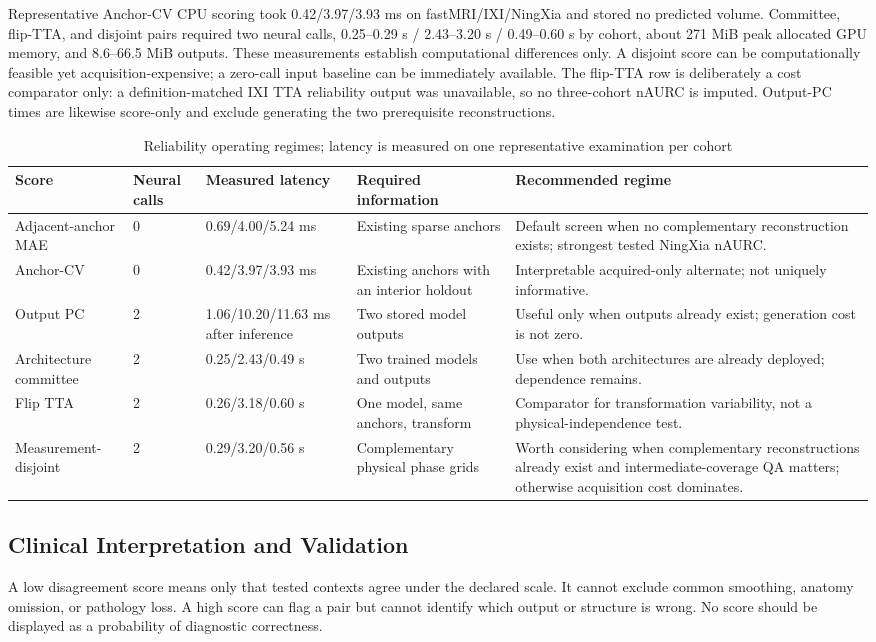 \documentclass[journal,10pt]{IEEEtran}
\begin{document}
Representative Anchor-CV CPU scoring took 0.42/3.97/3.93 ms on fastMRI/IXI/NingXia and stored no predicted volume. Committee, flip-TTA, and disjoint pairs required two neural calls, 0.25--0.29 s / 2.43--3.20 s / 0.49--0.60 s by cohort, about 271 MiB peak allocated GPU memory, and 8.6--66.5 MiB outputs. These measurements establish computational differences only. A disjoint score can be computationally feasible yet acquisition-expensive; a zero-call input baseline can be immediately available.
The flip-TTA row is deliberately a cost comparator only: a definition-matched IXI TTA reliability output was unavailable, so no three-cohort nAURC is imputed. Output-PC times are likewise score-only and exclude generating the two prerequisite reconstructions.

\begin{table}[t]
\caption{Reliability operating regimes; latency is measured on one representative examination per cohort}
\label{tab:operating-regime}\centering
\begin{tabular}{p{3.0cm}p{2.1cm}p{2.5cm}p{3.2cm}p{4.6cm}}
\toprule
Score&Neural calls&Measured latency&Required information&Recommended regime\\
\midrule
Adjacent-anchor MAE&0&0.69/4.00/5.24 ms&Existing sparse anchors&Default screen when no complementary reconstruction exists; strongest tested NingXia nAURC.\\
Anchor-CV&0&0.42/3.97/3.93 ms&Existing anchors with an interior holdout&Interpretable acquired-only alternate; not uniquely informative.\\
Output PC&2&1.06/10.20/11.63 ms after inference&Two stored model outputs&Useful only when outputs already exist; generation cost is not zero.\\
Architecture committee&2&0.25/2.43/0.49 s&Two trained models and outputs&Use when both architectures are already deployed; dependence remains.\\
Flip TTA&2&0.26/3.18/0.60 s&One model, same anchors, transform&Comparator for transformation variability, not a physical-independence test.\\
Measurement-disjoint&2&0.29/3.20/0.56 s&Complementary physical phase grids&Worth considering when complementary reconstructions already exist and intermediate-coverage QA matters; otherwise acquisition cost dominates.\\
\bottomrule
\end{tabular}
\end{table}

\subsection{Clinical Interpretation and Validation}
A low disagreement score means only that tested contexts agree under the declared scale. It cannot exclude common smoothing, anatomy omission, or pathology loss. A high score can flag a pair but cannot identify which output or structure is wrong. No score should be displayed as a probability of diagnostic correctness.
\end{document}
